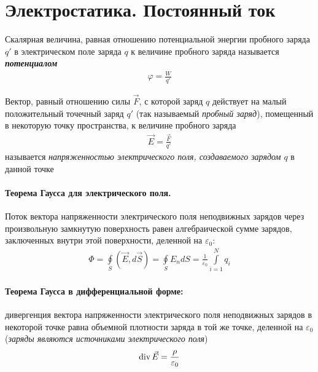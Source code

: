 \documentclass[12pt]{extarticle}
\begin{document}
\printindex \pagebreak

\section{Электростатика. Постоянный ток}
Скалярная величина, равная отношению потенциальной энергии пробного
заряда $q'$ в электрическом поле заряда $q$ к величине пробного заряда
называется \textbf{\textit{потенциалом}}
\begin{eqnarray*}
\varphi=\frac{W}{q'}
\end{eqnarray*}

\par Вектор, равный отношению силы $\vec{F}$, с которой заряд $q$ действует
на малый положительный точечный заряд $q'$ (так называемый
\textit{пробный заряд}), помещенный в некоторую точку пространства, к
величине пробного заряда
\begin{eqnarray*}
\vec{E}=\frac{\vec{F}}{q'}
\end{eqnarray*}
называется \textit{напряженностью электрического поля, создаваемого
зарядом $q$} в данной точке

\paragraph{Теорема Гаусса для электрического поля.} 
Поток вектора напряженности электрического поля неподвижных зарядов
через произвольную замкнутую поверхность равен алгебраической сумме
зарядов, заключенных внутри этой поверхности, деленной на
$\varepsilon_{0}$:
\begin{eqnarray*}
    \Phi=\oint\limits_{S}(\vec{E},d\vec{S})
    =\oint\limits_{S}E_{n}dS
    =\frac{1}{\varepsilon_{0}}\int\limits_{i=1}^{N}q_{i}
\end{eqnarray*}
\paragraph{Теорема Гаусса в дифференциальной форме:} дивергенция вектора
напряженности электрического поля неподвижных зарядов в некоторой точке
равна объемной плотности заряда в той же точке, деленной на
$\varepsilon_{0}$ (\textit{заряды являются источниками электрического
поля})
\begin{eqnarray*}
    \textmd{div}\,{\vec{E}}=\frac{\rho}{\varepsilon_{0}}
\end{eqnarray*}
\end{document}
